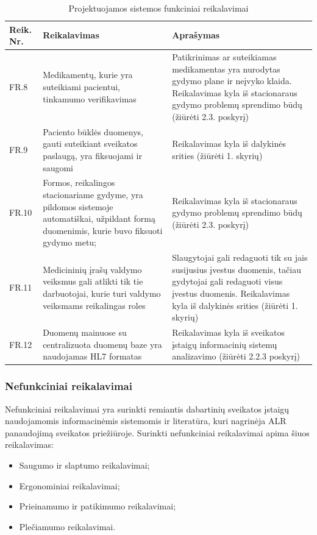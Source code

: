 \begin{table}[!ht]
    \centering
    \renewcommand{\arraystretch}{1.2}
    \renewcommand\thetable{5}
    \begin{tabular}{|m{3em}|m{17em}|m{17em}|}
    \hline 
    \rowcolor[HTML]{EFEFEF} 
    Reik. Nr. & Reikalavimas & Aprašymas \\ \hline
    FR.8  &  Medikamentų, kurie yra suteikiami pacientui, tinkamumo verifikavimas   &  Patikrinimas ar suteikiamas medikamentas yra nurodytas gydymo plane ir neįvyko klaida. Reikalavimas kyla iš stacionaraus gydymo problemų sprendimo būdų  (žiūrėti 2.3. poskyrį)       \\ \hline
    FR.9  &  Paciento būklės duomenys, gauti suteikiant sveikatos paslaugą, yra fiksuojami ir saugomi  &    Reikalavimas kyla iš dalykinės srities (žiūrėti 1. skyrių)       \\ \hline
    FR.10  &  Formos, reikalingos stacionariame gydyme, yra pildomos sistemoje automatiškai, užpildant formą duomenimis, kurie buvo fiksuoti gydymo metu;  &   Reikalavimas kyla iš stacionaraus gydymo problemų sprendimo būdų  (žiūrėti 2.3. poskyrį)       \\ \hline
    FR.11  &  Medicininių įrašų valdymo veiksmus gali atlikti tik tie darbuotojai, kurie turi valdymo veiksmams reikalingas roles  &  
    Slaugytojai gali redaguoti tik su jais susijusius įvestus duomenis, tačiau gydytojai gali redaguoti visus įvestus duomenis. Reikalavimas kyla iš dalykinės srities (žiūrėti 1. skyrių)       \\ \hline
    FR.12  &  Duomenų mainuose su centralizuota duomenų baze yra naudojamas HL7 formatas  &   Reikalavimas kyla iš sveikatos įstaigų informacinių sistemų analizavimo (žiūrėti 2.2.3 poskyrį)       \\ \hline
    \end{tabular}
    \caption{Projektuojamos sistemos funkciniai reikalavimai} 

\end{table}


\subsubsection{Nefunkciniai reikalavimai}
Nefunkciniai reikalavimai yra surinkti remiantis dabartinių sveikatos įstaigų naudojamomis informacinėmis sistemomis ir literatūra, kuri nagrinėja ALR panaudojimą sveikatos priežiūroje. Surinkti nefunkciniai reikalavimai apima šiuos reikalavimas:
\begin{itemize}
    \item Saugumo ir slaptumo reikalavimai;
    \item Ergonominiai reikalavimai;
    \item Prieinamumo ir patikimumo reikalavimai;
    \item Plečiamumo reikalavimai.
\end{itemize}

